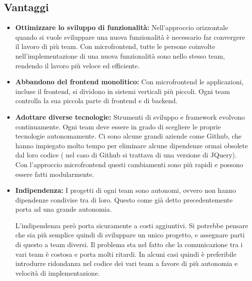 \subsection{Vantaggi}
\begin{itemize}
    \item \textbf{Ottimizzare lo sviluppo di funzionalità:}
Nell’approccio orizzontale quando si vuole sviluppare una nuova funzionalità è necessario far convergere il 
lavoro di più team. Con microfrontend,
  tutte le persone coinvolte nell’implementazione di una nuova funzionalità sono nello 
  stesso team, rendendo il lavoro più veloce ed efficiente. 
    \item \textbf{Abbandono del frontend monolitico:}
Con microfrontend le applicazioni, incluse il frontend, si dividono in sistemi verticali
 più piccoli. Ogni team controlla la sua piccola parte di frontend e di backend.
    \item \textbf{Adottare diverse tecnologie:}
Strumenti di sviluppo e framework evolvono continuamente. Ogni team deve essere in grado di scegliere
le proprie tecnologie autonomamente. Ci sono alcune grandi aziende
 come Github, che hanno
 impiegato molto tempo per eliminare alcune dipendenze ormai obsolete dal loro codice ( nel caso di Github si trattava di una versione di JQuery).
  Con l’approccio microfrontend questi cambiamenti sono più rapidi e possono essere
   fatti modularmente.


\item \textbf{Indipendenza:}
I progetti di ogni team sono autonomi, ovvero non hanno dipendenze condivise tra di loro.
Questo come già detto precedentemente porta ad una grande autonomia.

L’indipendenza però porta sicuramente a costi aggiuntivi. Si potrebbe pensare che sia
 più semplice quindi di sviluppare un unico progetto, e assegnare parti di questo a team diversi. 
 Il problema sta nel fatto che la comunicazione tra i vari team è costosa e porta molti ritardi.
In alcuni casi quindi è preferibile introdurre ridondanza nel codice dei vari team a favore di più autonomia e velocità di
 implementazione.

\end{itemize}

